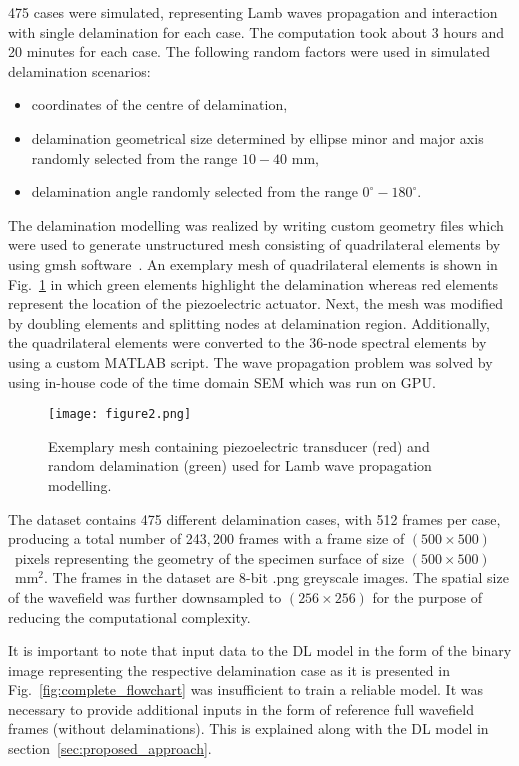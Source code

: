 475 cases were simulated, representing Lamb waves propagation and interaction 
with single delamination for each case. 
The computation took about 3 hours and 20 minutes for each case.
The following random factors were used in simulated delamination scenarios:
\begin{itemize}
	\item coordinates of the centre of delamination,
	\item delamination geometrical size	determined by ellipse minor and major axis randomly selected from the range $10-40$ mm,
	\item delamination angle randomly selected from the range $ 0^{\circ}-180^{\circ}$.
	
\end{itemize}
The delamination modelling was realized by writing custom geometry files which were used to generate unstructured mesh consisting of quadrilateral elements by using gmsh software~\cite{Geuzaine2009}.
An exemplary mesh of quadrilateral elements is shown in Fig.~\ref{fig:random_delam_mesh} in which green elements highlight the delamination whereas red elements represent the location of the piezoelectric actuator.
Next, the mesh was modified by doubling elements and splitting nodes at delamination region.
Additionally, the quadrilateral elements were converted to the 36-node spectral elements by using a custom MATLAB script.
The wave propagation problem was solved by using in-house code of the time domain SEM which was run on GPU.
\begin{figure} [h!]
	\begin{center}
		\texttt{[image: figure2.png]}
	\end{center}
	\caption{Exemplary mesh containing piezoelectric transducer (red) and random delamination (green) used for Lamb wave propagation modelling.} 
	\label{fig:random_delam_mesh}
\end{figure}
The dataset contains 475 different delamination cases, with 512 frames per case, producing a total number of 243,\,200 frames with a frame size of \((500\times500)\)~pixels representing the geometry of the specimen surface of size \((500\times500)\)~mm\(^{2}\).
The frames in the dataset are 8-bit .png greyscale images.
The spatial size of the wavefield was further downsampled to \((256\times256)\) for the purpose of 
reducing the computational complexity.

It is important to note that input data to the DL model in the form of the binary image representing the respective delamination case as it is presented in Fig.~\ref{fig:complete_flowchart} was insufficient to train a reliable model.
It was necessary to provide additional inputs in the form of reference full wavefield frames (without delaminations).
This is explained along with the DL model in section~\ref{sec:proposed_approach}.
